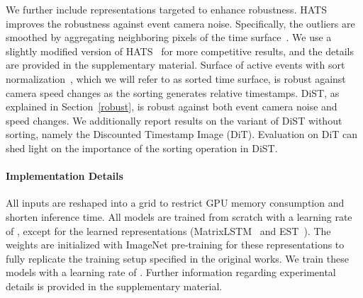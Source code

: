 We further include representations targeted to enhance robustness.
HATS~\cite{hats} improves the robustness against event camera noise.
Specifically, the outliers are smoothed by aggregating neighboring pixels of the time surface~\cite{hots}.
We use a slightly modified version of HATS~\cite{hats} for more competitive results, and the details are provided in the supplementary material.
Surface of active events with sort normalization~\cite{ace}, which we will refer to as sorted time surface, is robust against camera speed changes as the sorting generates relative timestamps. 
DiST, as explained in Section~\ref{robust}, is robust against both event camera noise and speed changes.
We additionally report results on the variant of DiST without sorting, namely the Discounted Timestamp Image (DiT).
Evaluation on DiT can shed light on the importance of the sorting operation in DiST.

\paragraph{Implementation Details}
All inputs are reshaped into a  grid to restrict GPU memory consumption and shorten inference time.
All models are trained from scratch with a learning rate of , except for the learned representations (MatrixLSTM~\cite{matrix_lstm} and EST~\cite{est}).
The weights are initialized with ImageNet pre-training for these representations to fully replicate the training setup specified in the original works.
We train these models with a learning rate of .
Further information regarding experimental details is provided in the supplementary material.


